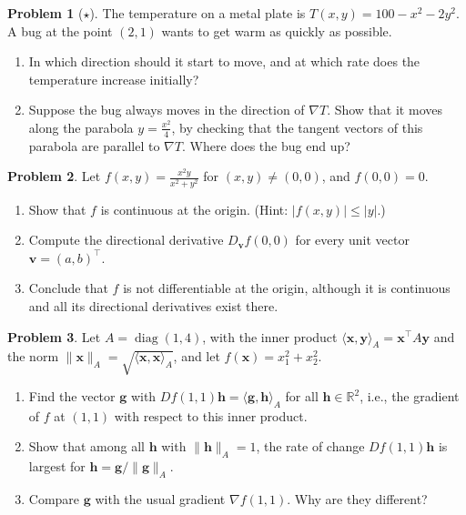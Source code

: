 \documentclass[11pt]{article}
\theoremstyle{definition}
\newtheorem{problem}{Problem}[section]
\newcommand{\norm}[1]{\lVert #1 \rVert}
\newcommand{\ip}[2]{\langle #1, #2 \rangle}
\DeclareMathOperator{\diag}{diag}
\begin{document}
\begin{problem}[$\star$]\label{pr:temperature}
    The temperature on a metal plate is $T(x, y) = 100 - x^2 - 2y^2$. A bug at the point $(2, 1)$ wants to get warm as quickly as possible.
    \begin{enumerate}[label=(\alph*)]
        \item In which direction should it start to move, and at which rate does the temperature increase initially?
        \item Suppose the bug always moves in the direction of $\nabla T$. Show that it moves along the parabola $y = \frac{x^2}{4}$, by checking that the tangent vectors of this parabola are parallel to $\nabla T$. Where does the bug end up?
    \end{enumerate}
\end{problem}

\begin{problem}\label{pr:directional-not-diff}
    Let $f(x, y) = \frac{x^2 y}{x^2 + y^2}$ for $(x, y) \neq (0, 0)$, and $f(0, 0) = 0$.
    \begin{enumerate}[label=(\alph*)]
        \item Show that $f$ is continuous at the origin. (Hint: $|f(x, y)| \leq |y|$.)
        \item Compute the directional derivative $D_{\mathbf{v}} f(0, 0)$ for every unit vector $\mathbf{v} = (a, b)^\top$.
        \item Conclude that $f$ is not differentiable at the origin, although it is continuous and all its directional derivatives exist there.
    \end{enumerate}
\end{problem}

\begin{problem}\label{pr:gradient-ip}
    Let $A = \diag(1, 4)$, with the inner product $\ip{\mathbf{x}}{\mathbf{y}}_A = \mathbf{x}^\top A\mathbf{y}$ and the norm $\norm{\mathbf{x}}_A = \sqrt{\ip{\mathbf{x}}{\mathbf{x}}_A}$, and let $f(\mathbf{x}) = x_1^2 + x_2^2$.
    \begin{enumerate}[label=(\alph*)]
        \item Find the vector $\mathbf{g}$ with $Df(1, 1)\mathbf{h} = \ip{\mathbf{g}}{\mathbf{h}}_A$ for all $\mathbf{h} \in \mathbb{R}^2$, i.e., the gradient of $f$ at $(1, 1)$ with respect to this inner product.
        \item Show that among all $\mathbf{h}$ with $\norm{\mathbf{h}}_A = 1$, the rate of change $Df(1, 1)\mathbf{h}$ is largest for $\mathbf{h} = \mathbf{g}/\norm{\mathbf{g}}_A$.
        \item Compare $\mathbf{g}$ with the usual gradient $\nabla f(1, 1)$. Why are they different?
    \end{enumerate}
\end{problem}
\end{document}
